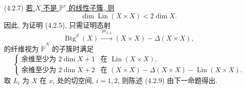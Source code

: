 \medskip
\noindent(4.2.7) \underline{若 $X$ 不是 $\mathbb P^r$ 的线性子簇, 则}
\[
\dim\operatorname{Lin}(X\times X)<2\dim X.
\]
因此, 为证明 (4.2.5), 只需证明态射
\begin{equation}\tag{4.2.8}
\operatorname{Btg}^{d}(X)
\xrightarrow{\ \operatorname{pr}_{2,3}\ }
(X\times X)-\Delta(X\times X),
\end{equation}
的纤维视为 $\check{\mathbb P}^{N}$ 的子簇时满足
\begin{equation}\tag{4.2.9}
\left\{
\begin{array}{ll}
\text{余维至少为 $2\dim X+1$}
 &\text{在 $\operatorname{Lin}(X\times X)$},\\[1ex]
\text{余维至少为 $2\dim X+2$}
 &\text{在 $(X\times X)-\Delta(X\times X)
                 -\operatorname{Lin}(X\times X)$.}
\end{array}
\right.
\end{equation}
取 $L_i$ 为 $X$ 在 $x_i$ 处的切空间, $i=1,2$, 则陈述 (4.2.9) 由下一命题得出.